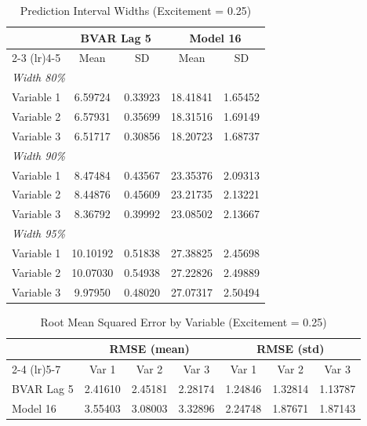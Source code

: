 \begin{table}[htbp]
\centering
\caption{Prediction Interval Widths (Excitement = 0.25)}
\label{tab:width_0p25}
\begin{tabular}{lcccc}
\toprule
 & \multicolumn{2}{c}{BVAR Lag 5} & \multicolumn{2}{c}{Model 16} \\
\cmidrule(lr){2-3} \cmidrule(lr){4-5}
 & Mean & SD & Mean & SD \\
\midrule
\multicolumn{5}{l}{\textit{Width 80\%}} \\
Variable 1 & 6.59724 & 0.33923 & 18.41841 & 1.65452 \\
Variable 2 & 6.57931 & 0.35699 & 18.31516 & 1.69149 \\
Variable 3 & 6.51717 & 0.30856 & 18.20723 & 1.68737 \\
\multicolumn{5}{l}{\textit{Width 90\%}} \\
Variable 1 & 8.47484 & 0.43567 & 23.35376 & 2.09313 \\
Variable 2 & 8.44876 & 0.45609 & 23.21735 & 2.13221 \\
Variable 3 & 8.36792 & 0.39992 & 23.08502 & 2.13667 \\
\multicolumn{5}{l}{\textit{Width 95\%}} \\
Variable 1 & 10.10192 & 0.51838 & 27.38825 & 2.45698 \\
Variable 2 & 10.07030 & 0.54938 & 27.22826 & 2.49889 \\
Variable 3 & 9.97950 & 0.48020 & 27.07317 & 2.50494 \\
\bottomrule
\end{tabular}
\end{table}

\begin{table}[htbp]
\centering
\caption{Root Mean Squared Error by Variable (Excitement = 0.25)}
\label{tab:rmse_0p25}
\begin{tabular}{lcccccc}
\toprule
 & \multicolumn{3}{c}{RMSE (mean)} & \multicolumn{3}{c}{RMSE (std)} \\
\cmidrule(lr){2-4} \cmidrule(lr){5-7}
 & Var 1 & Var 2 & Var 3 & Var 1 & Var 2 & Var 3 \\
\midrule
BVAR Lag 5 & 2.41610 & 2.45181 & 2.28174 & 1.24846 & 1.32814 & 1.13787 \\
Model 16 & 3.55403 & 3.08003 & 3.32896 & 2.24748 & 1.87671 & 1.87143 \\
\bottomrule
\end{tabular}
\end{table}


